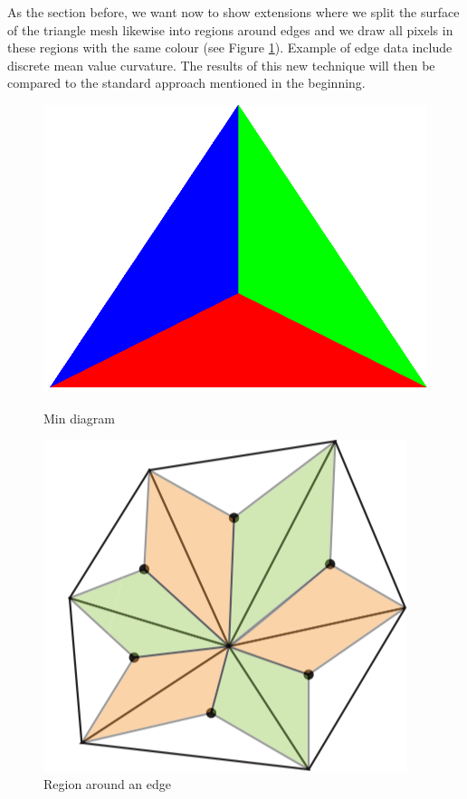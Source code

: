 As the section before, we want now to show extensions where we split the surface of the triangle mesh likewise into regions around  edges and we draw all pixels in these regions with the same colour (see Figure \ref{fig:edge-area}). Example of edge data include discrete mean value curvature. The results of this new technique will then be compared to the standard approach mentioned in the beginning.

\begin{figure}[!h]
    \centering
    \centering
    \includegraphics[scale=0.15]{images/min.png}
    \caption{Min diagram}\label{fig:min-diagram}
    \endminipage\hfill
    \centering
    \includegraphics[scale=0.6]{images/edge-area.png}
    \caption{Region around an edge}\label{fig:edge-area}
    \endminipage
\end{figure}

